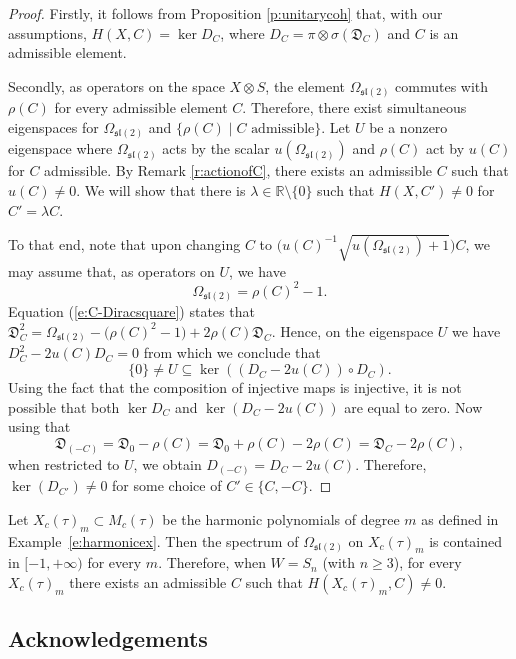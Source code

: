 \documentclass[10pt,a4paper]{amsart}
\numberwithin{equation}{section}
\newcommand{\fD}{\mathfrak{D}}
\newcommand{\bbr}{\mathbb{R}}
\begin{document}
\begin{proof}
Firstly, it follows from Proposition \ref{p:unitarycoh} that, with our assumptions, $H(X,C) = \ker D_C$, where $D_C = \pi\otimes\sigma(\fD_C)$ and $C$ is an admissible element.

Secondly, as operators on the space $X \otimes S$, the element $\Omega_{\mathfrak{sl}(2)}$ commutes with $\rho(C)$ for every admissible element $C$. Therefore, there exist simultaneous eigenspaces for $\Omega_{\mathfrak{sl}(2)}$ and $\{\rho(C) \mid C \text{ admissible}\}$. Let $U$ be a nonzero eigenspace where $\Omega_{\mathfrak{sl}(2)}$ acts by the scalar $u(\Omega_{\mathfrak{sl}(2)})$ and $\rho(C)$ act by $u(C)$ for $C$ admissible. By Remark \ref{r:actionofC}, there exists an admissible $C$ such that $u(C)\neq 0$. We will show that there is $\lambda \in \bbr\setminus \{0\}$ such that $H(X,C')\neq 0$ for $C' = \lambda C$.

To that end, note that upon changing $C$ to $\big(u(C)^{-1}\sqrt{u(\Omega_{\mathfrak{sl}(2)})+1}\big)C$, we may assume that, as operators on $U$, we have
\[\Omega_{\mathfrak{sl}(2)} = \rho(C)^2 -1.\]
Equation (\ref{e:C-Diracsquare}) states that $ \mathfrak{D}_{C}^2 = \Omega_{\mathfrak{sl}(2)} - \big(\rho(C)^2 - 1\big) + 2\rho(C)\mathfrak{D}_{C}$. Hence, on the eigenspace $U$ we have $ D_{C}^2 -2u(C)D_{C} = 0$ from which we conclude that
\[
\{0\}\neq U \subseteq \ker ((D_{C} -2u(C))\circ D_{C}).
\]
Using the fact that the composition of injective maps is injective, it is not possible that both $\ker D_{C}$ and $\ker (D_{C} -2u(C))$ are equal to
zero. Now using that
\[
\fD_{(-C)} = \fD_0 - \rho(C) = \fD_0 + \rho(C) -2\rho(C) = \fD_C - 2\rho(C),
\]
when restricted to $U$, we obtain $D_{(-C)} = D_{C} -2u(C)$. Therefore, $\ker(D_{C'}) \neq 0$ for some choice of $C' \in \{C,-C\}$.
\end{proof}

\begin{Example}
Let $X_c(\tau)_m \subset M_c(\tau)$ be the harmonic polynomials of degree $m$ as defined in Example~\ref{e:harmonicex}. Then the spectrum of $\Omega_{\mathfrak{sl}(2)}$ on $X_c(\tau)_m$ is contained in $[-1,+\infty)$ for every $m$. Therefore, when $W= S_n$ (with $n \geq 3$), for every $X_c(\tau)_m$ there exists an admissible $C$ such that $H(X_c(\tau)_m, C) \neq 0$.
\end{Example}

\subsection*{Acknowledgements}
\end{document}
